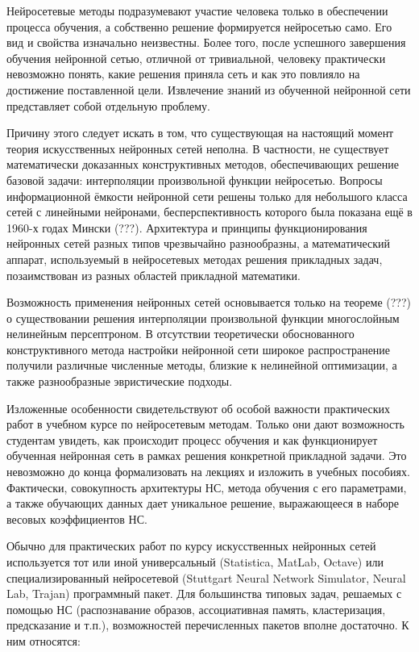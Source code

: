 Нейросетевые методы подразумевают участие человека только в
обеспечении процесса обучения, а собственно решение формируется
нейросетью само.  Его вид и свойства изначально неизвестны.  Более
того, после успешного завершения обучения нейронной сетью, отличной от
тривиальной, человеку практически невозможно понять, какие решения
приняла сеть и как это повлияло на достижение поставленной цели.
Извлечение знаний из обученной нейронной сети представляет собой
отдельную проблему.

Причину этого следует искать в том, что существующая на настоящий
момент теория искусственных нейронных сетей неполна.  В частности, не
существует математически доказанных конструктивных методов,
обеспечивающих решение базовой задачи: интерполяции произвольной
функции нейросетью.  Вопросы информационной ёмкости нейронной сети
решены только для небольшого класса сетей с линейными нейронами,
бесперспективность которого была показана ещё в 1960-х годах Мински
(???).  Архитектура и принципы функционирования нейронных сетей разных
типов чрезвычайно разнообразны, а математический аппарат, используемый
в нейросетевых методах решения прикладных задач, позаимствован из
разных областей прикладной математики.

Возможность применения нейронных сетей основывается только на теореме
(???) о существовании решения интерполяции произвольной функции
многослойным нелинейным персептроном.  В отсутствии теоретически
обоснованного конструктивного метода настройки нейронной сети широкое
распространение получили различные численные методы, близкие к
нелинейной оптимизации, а также разнообразные эвристические подходы.

Изложенные особенности свидетельствуют об особой важности практических
работ в учебном курсе по нейросетевым методам.  Только они дают
возможность студентам увидеть, как происходит процесс обучения и как
функционирует обученная нейронная сеть в рамках решения конкретной
прикладной задачи.  Это невозможно до конца формализовать на лекциях и
изложить в учебных пособиях.  Фактически, совокупность архитектуры НС,
метода обучения с его параметрами, а также обучающих данных дает
уникальное решение, выражающееся в наборе весовых коэффициентов НС.


Обычно для практических работ по курсу искусственных нейронных сетей
используется тот или иной универсальный (Statistica, MatLab, Octave)
или специализированный нейросетевой (Stuttgart Neural Network
Simulator, Neural Lab, Trajan) программный пакет.  Для большинства
типовых задач, решаемых с помощью НС (распознавание образов,
ассоциативная память, кластеризация, предсказание и т.п.),
возможностей перечисленных пакетов вполне достаточно.  К ним
относятся:

